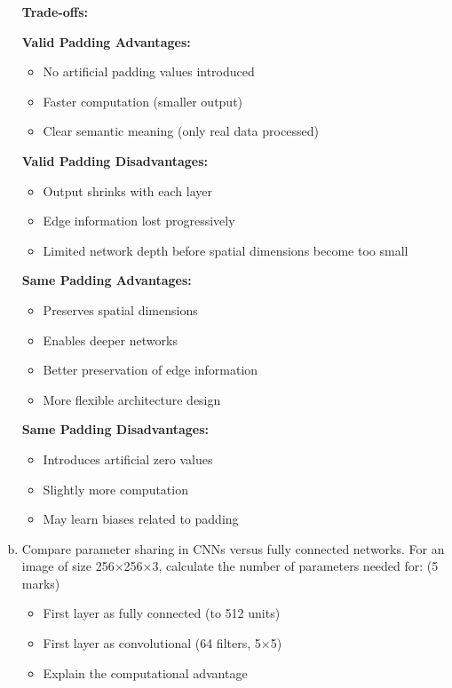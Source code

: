 \documentclass[12pt]{article}
\begin{document}
\begin{enumerate}[(a)]
{    \textbf{Trade-offs:}
    
    \textbf{Valid Padding Advantages:}
    \begin{itemize}
        \item No artificial padding values introduced
        \item Faster computation (smaller output)
        \item Clear semantic meaning (only real data processed)
    \end{itemize}
    
    \textbf{Valid Padding Disadvantages:}
    \begin{itemize}
        \item Output shrinks with each layer
        \item Edge information lost progressively
        \item Limited network depth before spatial dimensions become too small
    \end{itemize}
    
    \textbf{Same Padding Advantages:}
    \begin{itemize}
        \item Preserves spatial dimensions
        \item Enables deeper networks
        \item Better preservation of edge information
        \item More flexible architecture design
    \end{itemize}
    
    \textbf{Same Padding Disadvantages:}
    \begin{itemize}
        \item Introduces artificial zero values
        \item Slightly more computation
        \item May learn biases related to padding
    \end{itemize}
    }
    
    \item Compare parameter sharing in CNNs versus fully connected networks. For an image of size 256×256×3, calculate the number of parameters needed for: \hfill (5 marks)
    \begin{itemize}
        \item First layer as fully connected (to 512 units)
        \item First layer as convolutional (64 filters, 5×5)
        \item Explain the computational advantage
    \end{itemize}
    

\end{enumerate}
\end{document}
